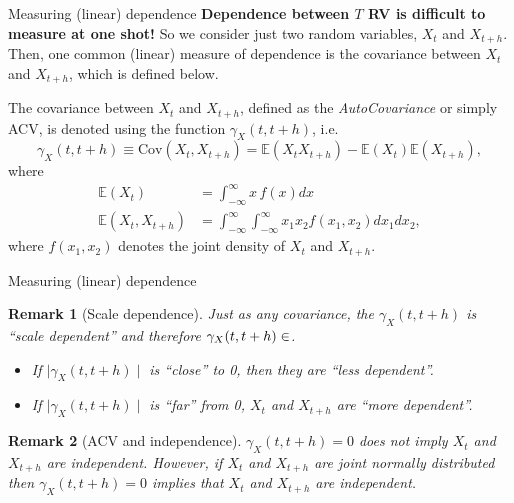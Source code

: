 \documentclass[envcountsect,usenames,dvipsnames]{beamer}
\theoremstyle{mystyle}
\newtheorem{Remark}{Remark}
\begin{document}
\begin{frame}{Measuring (linear) dependence}
\footnotesize
	{\textbf{\color{beamer@myorange}Dependence between $T$ RV is difficult to measure at one shot!}} So we consider just two random variables, $X_{t}$ and $X_{t+h}$. Then, one common (linear) measure of dependence is the covariance between $X_{t}$ and $X_{t+h}$, which is defined below.
	
	\begin{Definition}[AutoCovariance]
	\label{definition:autocov}
		The covariance between $X_{t}$ and $X_{t+h}$, defined as the {\color{beamer@myorange}\emph{AutoCovariance}} or simply ACV,  is denoted using the function $\gamma_X(t, t+h)$, i.e.
%
        \begin{equation*}
            \gamma_X(t, t+h) \equiv	\text{Cov}(X_{t},X_{t+h})= 	\mathbb{E}(X_{t}X_{t+h})-	\mathbb{E}(X_{t})	\mathbb{E}(X_{t+h}),
        \end{equation*}
%				
where
%
        \begin{equation*}
            \begin{aligned}
                \mathbb{E}(X_{t}) &= \int_{-\infty}^{\infty}x \, f(x) dx \\
		        \mathbb{E}(X_{t},X_{t+h}) &= \int_{-\infty}^{\infty}\int_{-\infty}^{\infty}x_{1}x_{2} f(x_{1},x_{2}) dx_{1}dx_{2},
            \end{aligned}
        \end{equation*}
        where $f(x_{1},x_{2})$ denotes the joint density of $X_{t}$ and $X_{t+h}$.
	\end{Definition}
\end{frame}


\begin{frame}{Measuring (linear) dependence}
	
	\begin{Remark}[Scale dependence]
	Just as any covariance, the $\gamma_X(t, t+h)$ is ``scale dependent'' and therefore $\gamma_X(t, t+h)\in\real$.
				\begin{itemize}
					\item If $\mid \gamma_X(t, t+h) \mid$ is ``close'' to 0, then they are ``less dependent''.
					\item If $\mid \gamma_X(t, t+h) \mid$ is ``far'' from 0, $X_{t}$ and $X_{t+h}$ are ``more dependent''.
				\end{itemize}
	\end{Remark}
	
	\begin{Remark}[ACV and independence]
	$\gamma_X(t, t+h)=0$ does not imply $X_{t}$ and $X_{t+h}$ are independent. However, if $X_{t}$ and $X_{t+h}$ are joint normally distributed then $\gamma_X(t, t+h)=0$ implies that $X_{t}$ and $X_{t+h}$ are independent.
	\end{Remark}
	
\end{frame}
\end{document}

